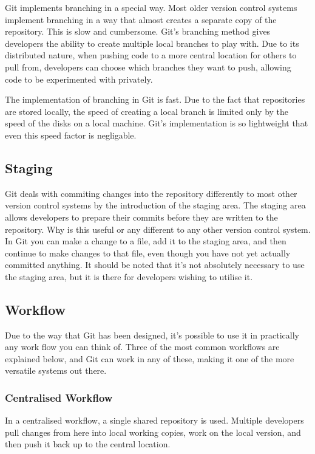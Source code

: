 Git implements branching in a special way.
Most older version control systems implement branching in a way that almost creates a separate copy of the repository.
This is slow and cumbersome.
Git's branching method gives developers the ability to create multiple local branches to play with.
Due to its distributed nature, when pushing code to a more central location for others to pull from, developers can choose which branches they want to push, allowing code to be experimented with privately.

The implementation of branching in Git is fast.
Due to the fact that repositories are stored locally, the speed of creating a local branch is limited only by the speed of the disks on a local machine.
Git's implementation is so lightweight that even this speed factor is negligable.

\subsection{Staging}

Git deals with commiting changes into the repository differently to most other version control systems by the introduction of the staging area.
The staging area allows developers to prepare their commits before they are written to the repository.
Why is this useful or any different to any other version control system.
In Git you can make a change to a file, add it to the staging area, and then continue to make changes to that file, even though you have not yet actually committed anything.
It should be noted that it's not absolutely necessary to use the staging area, but it is there for developers wishing to utilise it.

\subsection{Workflow}

Due to the way that Git has been designed, it's possible to use it in practically any work flow you can think of.
Three of the most common workflows are explained below, and Git can work in any of these, making it one of the more versatile systems out there.

\subsubsection{Centralised Workflow}

In a centralised workflow, a single shared repository is used.
Multiple developers pull changes from here into local working copies, work on the local version, and then push it back up to the central location.

